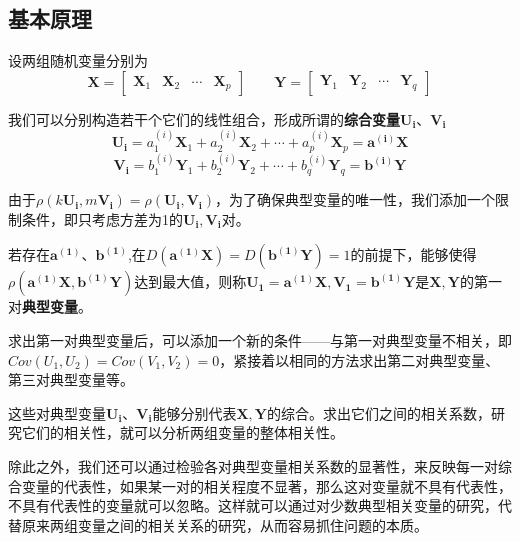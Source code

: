 \documentclass[withoutpreface]{cumcmthesis}
\begin{document}
\subsection{基本原理}

设两组随机变量分别为
\begin{equation*}
    \mathbf{X}=\begin{bmatrix}
        \mathbf{X}_1 & \mathbf{X}_2 & \cdots & \mathbf{X}_p
    \end{bmatrix}
    \qquad
    \mathbf{Y}=\begin{bmatrix}
        \mathbf{Y}_1 & \mathbf{Y}_2 & \cdots & \mathbf{Y}_q
    \end{bmatrix}
\end{equation*}

我们可以分别构造若干个它们的线性组合，形成所谓的\textbf{综合变量}$\mathbf{U_i}$、$\mathbf{V_i}$
\begin{equation}
    \mathbf{U_i}=a_1^{(i)}\mathbf{X}_1+a_2^{(i)}\mathbf{X}_2+\cdots+a_p^{(i)}\mathbf{X}_p=\mathbf{{a}^{(i)}X}
\end{equation}
\begin{equation}
    \mathbf{V_i}=b_1^{(i)}\mathbf{Y}_1+b_2^{(i)}\mathbf{Y}_2+\cdots+b_q^{(i)}\mathbf{Y}_q=\mathbf{{b}^{(i)}Y}
\end{equation}

由于$\rho (k\mathbf{U_i},m\mathbf{V_i})=\rho (\mathbf{U_i},\mathbf{V_i})$，为了确保典型变量的唯一性，我们添加一个限制条件，即只考虑方差为1的$\mathbf{U_i},\mathbf{V_i}$对。

若存在$\mathbf{a^{(1)}}$、$\mathbf{b^{(1)}}$,在$D(\mathbf{a^{(1)}X})=D(\mathbf{b^{(1)}Y})=1$的前提下，能够使得$\rho (\mathbf{a^{(1)}X},\mathbf{b^{(1)}Y})$达到最大值，则称$\mathbf{U_1}=\mathbf{a^{(1)}X},\mathbf{V_1}=\mathbf{b^{(1)}Y}$是$\mathbf{X},\mathbf{Y}$的第一对\textbf{典型变量}。

求出第一对典型变量后，可以添加一个新的条件——与第一对典型变量不相关，即$Cov(U_1,U_2)=Cov(V_1,V_2)=0$，紧接着以相同的方法求出第二对典型变量、第三对典型变量等。

这些对典型变量$\mathbf{U_i}$、$\mathbf{V_i}$能够分别代表$\mathbf{X},\mathbf{Y}$的综合。求出它们之间的相关系数，研究它们的相关性，就可以分析两组变量的整体相关性。

除此之外，我们还可以通过检验各对典型变量相关系数的显著性，来反映每一对综合变量的代表性，如果某一对的相关程度不显著，那么这对变量就不具有代表性，不具有代表性的变量就可以忽略。这样就可以通过对少数典型相关变量的研究，代替原来两组变量之间的相关关系的研究，从而容易抓住问题的本质。
\end{document}

